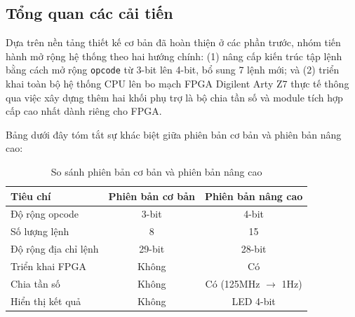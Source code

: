 \subsection{Tổng quan các cải tiến}
Dựa trên nền tảng thiết kế cơ bản đã hoàn thiện ở các phần trước, nhóm tiến hành mở rộng hệ thống theo hai hướng chính: (1) nâng cấp kiến trúc tập lệnh bằng cách mở rộng \texttt{opcode} từ 3-bit lên 4-bit, bổ sung 7 lệnh mới; và (2) triển khai toàn bộ hệ thống CPU lên bo mạch FPGA Digilent Arty Z7 thực tế thông qua việc xây dựng thêm hai khối phụ trợ là bộ chia tần số và module tích hợp cấp cao nhất dành riêng cho FPGA.

Bảng dưới đây tóm tắt sự khác biệt giữa phiên bản cơ bản và phiên bản nâng cao:

\begin{table}[H]
\centering
\begin{tabular}{|l|c|c|}
\hline
\textbf{Tiêu chí} & \textbf{Phiên bản cơ bản} & \textbf{Phiên bản nâng cao} \\
\hline
Độ rộng opcode       & 3-bit  & 4-bit \\
\hline
Số lượng lệnh        & 8      & 15    \\
\hline
Độ rộng địa chỉ lệnh & 29-bit & 28-bit \\
\hline
Triển khai FPGA      & Không  & Có    \\
\hline
Chia tần số          & Không  & Có (125MHz $\rightarrow$ 1Hz) \\
\hline
Hiển thị kết quả     & Không  & LED 4-bit \\
\hline
\end{tabular}
\caption{So sánh phiên bản cơ bản và phiên bản nâng cao}
\label{tab:levelup_compare}
\end{table}